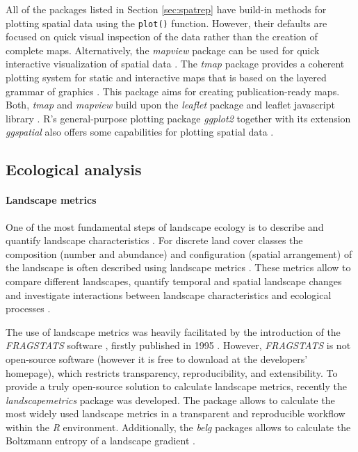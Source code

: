 \documentclass[smallextended]{svjour3}       %
\begin{document}
All of the packages listed in Section \ref{sec:spatrep} have build-in methods for plotting spatial data using the \texttt{plot()} function.
However, their defaults are focused on quick visual inspection of the data rather than the creation of complete maps.
Alternatively, the \emph{mapview} package can be used for quick interactive visualization of spatial data \cite{R-mapview}.
The \emph{tmap} package provides a coherent plotting system for static and interactive maps that is based on the layered grammar of graphics \cite{Tennekes2018}.
This package aims for creating publication-ready maps.
Both, \emph{tmap} and \emph{mapview} build upon the \emph{leaflet} package and leaflet javascript library \cite{R-leaflet}.
R's general-purpose plotting package \emph{ggplot2} together with its extension \emph{ggspatial} also offers some capabilities for plotting spatial data \cite{Wickham2016a,R-ggspatial}.

\hypertarget{sec:ecological_analysis}{%
\subsection{Ecological analysis}\label{sec:ecological_analysis}}

\hypertarget{sec:landscape_metrics}{%
\paragraph{Landscape metrics}\label{sec:landscape_metrics}}

One of the most fundamental steps of landscape ecology is to describe and quantify landscape characteristics \cite{Turner2005,Lausch2015}.
For discrete land cover classes the composition (number and abundance) and configuration (spatial arrangement) of the landscape is often described using landscape metrics \cite{Gustafson1998,Uuemaa2009,Uuemaa2013,Gustafson2019}.
These metrics allow to compare different landscapes, quantify temporal and spatial landscape changes and investigate interactions between landscape characteristics and ecological processes \cite{Uuemaa2009}.

The use of landscape metrics was heavily facilitated by the introduction of the \emph{FRAGSTATS} software \cite{McGarigal2012}, firstly published in 1995 \cite{Kupfer2012,Gustafson2019}.
However, \emph{FRAGSTATS} is not open-source software (however it is free to download at the developers' homepage), which restricts transparency, reproducibility, and extensibility.
To provide a truly open-source solution to calculate landscape metrics, recently the \emph{landscapemetrics} package \cite{Hesselbarth2019a} was developed.
The package allows to calculate the most widely used landscape metrics in a transparent and reproducible workflow within the \emph{R} environment.
Additionally, the \emph{belg} packages allows to calculate the Boltzmann entropy of a landscape gradient \cite{R-belgpaper}.
\end{document}
